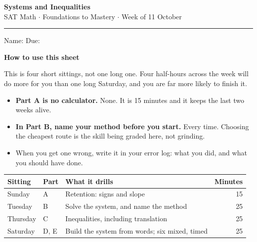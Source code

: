 \documentclass[11pt,a4paper]{article}
\newif\ifANSWERS
\begin{document}
\label{firstpage}

\begin{center}
{\LARGE\bfseries\color{navy}Systems and Inequalities}\\[4pt]
{\color{navy}SAT Math $\cdot$ Foundations to Mastery $\cdot$ Week of 11 October}
\ifANSWERS\\[4pt]{\color{keyred}\bfseries ANSWER KEY --- tutor copy}\fi
\end{center}
\vspace{2pt}
{\color{rule}\rule{\textwidth}{1pt}}
\vspace{6pt}

\ifANSWERS\else
Name: \underline{\hspace{6cm}} \hfill Due: \underline{\hspace{3.2cm}}
\vspace{6pt}
\fi

\begin{mdframed}[backgroundcolor=boxbg,linecolor=navy,linewidth=0.6pt,innertopmargin=6pt,innerbottommargin=8pt]
{\bfseries\color{navy}How to use this sheet}\par\vspace{2pt}
This is four short sittings, not one long one. Four half-hours across the week will
do more for you than one long Saturday, and you are far more likely to finish it.

\begin{itemize}[leftmargin=14pt,itemsep=1pt,topsep=3pt]
  \item \textbf{Part A is no calculator.} None. It is 15 minutes and it keeps the last two weeks alive.
  \item \textbf{In Part B, name your method before you start.} Every time. Choosing the cheapest route is the skill being graded here, not grinding.
  \item When you get one wrong, write it in your error log: what you did, and what you should have done.
\end{itemize}
\end{mdframed}

\vspace{4pt}
\begin{center}
\begin{tabularx}{\textwidth}{@{}l l X r@{}}
\textbf{Sitting} & \textbf{Part} & \textbf{What it drills} & \textbf{Minutes}\\[2pt]
\hline\rule{0pt}{11pt}
Sunday   & A    & Retention: signs and slope                       & 15\\
Tuesday  & B    & Solve the system, and name the method            & 25\\
Thursday & C    & Inequalities, including translation              & 25\\
Saturday & D, E & Build the system from words; six mixed, timed    & 25\\
\hline
\end{tabularx}
\end{center}
\end{document}
